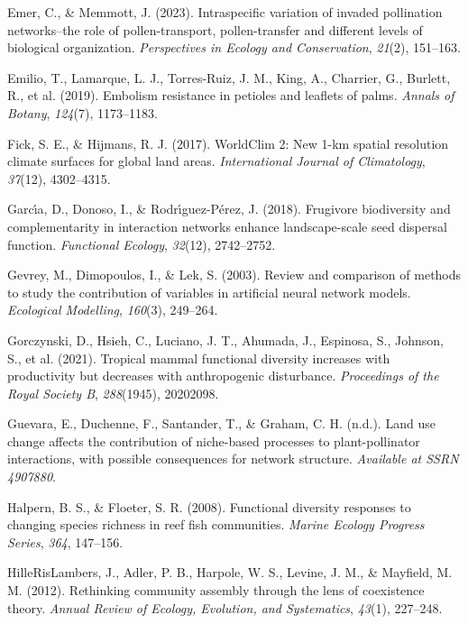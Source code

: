 \documentclass[
]{agujournal2019}
\newlength{\cslhangindent}
\newenvironment{CSLReferences}[2] %
 {\begin{list}{}{%
  \setlength{\itemindent}{0pt}
  \setlength{\leftmargin}{0pt}
  \setlength{\parsep}{0pt}
  \ifodd #1
   \setlength{\leftmargin}{\cslhangindent}
   \setlength{\itemindent}{-1\cslhangindent}
  \fi
  \setlength{\itemsep}{#2\baselineskip}}}
 {\end{list}}
\begin{document}
\begin{CSLReferences}{1}{0}
Emer, C., \& Memmott, J. (2023). Intraspecific variation of invaded
pollination networks--the role of pollen-transport, pollen-transfer and
different levels of biological organization. \emph{Perspectives in
Ecology and Conservation}, \emph{21}(2), 151--163.

Emilio, T., Lamarque, L. J., Torres-Ruiz, J. M., King, A., Charrier, G.,
Burlett, R., et al. (2019). Embolism resistance in petioles and leaflets
of palms. \emph{Annals of Botany}, \emph{124}(7), 1173--1183.

Fick, S. E., \& Hijmans, R. J. (2017). WorldClim 2: New 1-km spatial
resolution climate surfaces for global land areas. \emph{International
Journal of Climatology}, \emph{37}(12), 4302--4315.

Garcı́a, D., Donoso, I., \& Rodrı́guez-Pérez, J. (2018). Frugivore
biodiversity and complementarity in interaction networks enhance
landscape-scale seed dispersal function. \emph{Functional Ecology},
\emph{32}(12), 2742--2752.

Gevrey, M., Dimopoulos, I., \& Lek, S. (2003). Review and comparison of
methods to study the contribution of variables in artificial neural
network models. \emph{Ecological Modelling}, \emph{160}(3), 249--264.

Gorczynski, D., Hsieh, C., Luciano, J. T., Ahumada, J., Espinosa, S.,
Johnson, S., et al. (2021). Tropical mammal functional diversity
increases with productivity but decreases with anthropogenic
disturbance. \emph{Proceedings of the Royal Society B},
\emph{288}(1945), 20202098.

Guevara, E., Duchenne, F., Santander, T., \& Graham, C. H. (n.d.). Land
use change affects the contribution of niche-based processes to
plant-pollinator interactions, with possible consequences for network
structure. \emph{Available at SSRN 4907880}.

Halpern, B. S., \& Floeter, S. R. (2008). Functional diversity responses
to changing species richness in reef fish communities. \emph{Marine
Ecology Progress Series}, \emph{364}, 147--156.

HilleRisLambers, J., Adler, P. B., Harpole, W. S., Levine, J. M., \&
Mayfield, M. M. (2012). Rethinking community assembly through the lens
of coexistence theory. \emph{Annual Review of Ecology, Evolution, and
Systematics}, \emph{43}(1), 227--248.


\end{CSLReferences}
\end{document}
